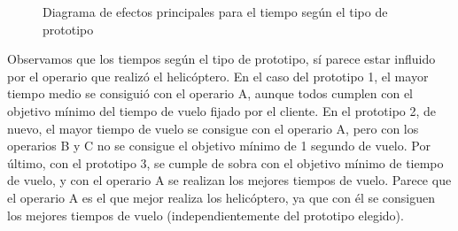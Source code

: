 \documentclass[12pt,a4paper,twoside,openright,titlepage,final]{article}
\begin{document}
\begin{figure}[htbp!]
	\centering
	\caption{Diagrama de efectos principales para el tiempo según el tipo de prototipo} \label{fig:efectos_principales_prototipos}
\end{figure}

Observamos que los tiempos según el tipo de prototipo, sí parece estar influido por el operario que realizó el helicóptero. En el caso del prototipo 1, el mayor tiempo medio se consiguió con el operario A, aunque todos cumplen con el objetivo mínimo del tiempo de vuelo fijado por el cliente. En el prototipo 2, de nuevo, el mayor tiempo de vuelo se consigue con el operario A, pero con los operarios B y C no se consigue el objetivo mínimo de 1 segundo de vuelo. Por último, con el prototipo 3, se cumple de sobra con el objetivo mínimo de tiempo de vuelo, y con el operario A se realizan los mejores tiempos de vuelo. Parece que el operario A es el que mejor realiza los helicóptero, ya que con él se consiguen los mejores tiempos de vuelo (independientemente del prototipo elegido).\\
\end{document}
